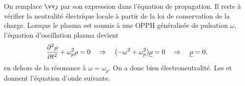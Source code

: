 \documentclass[12pt,fancy]{cours}
\begin{document}
 On remplace $\j$ par son expression dans l'équation de propagation.  Il reste à vérifier la neutralité électrique locale à partir de la loi de conservation de la charge. Lorsque le plasma est soumis à une OPPH généralisée de pulsation $\omega$, l'équation d'oscillation plasma devient
\begin{equation}
  \frac{\partial^2{\rho}}{\partial{t}^2} + \omega_p^2 \rho = 0 \quad \Rightarrow \quad ( -\omega^2 +\omega_p^2)\underline{\rho} = 0 \quad \Rightarrow \quad \underline{\rho} = 0,
\end{equation}
en dehors de la résonance à $\omega=\omega_p$. On a donc bien électroneutralité. Les  et  donnent l'équation d'onde suivante.



\end{document}
